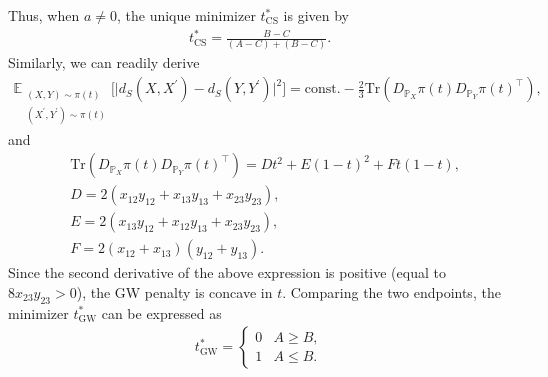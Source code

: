 \documentclass{article}
\begin{document}
Thus, when $a \neq 0$, the unique minimizer $t_{\mathrm{CS}}^\ast$ is given by 
\begin{align*}
	t_{\mathrm{CS}}^\ast = \frac{B - C}{(A - C) + (B - C)} .
\end{align*}
Similarly, we can readily derive
\begin{align*}
	\mathbb{E}_{\substack{(X,Y)\sim\pi(t)\\(X^\prime,Y^\prime)\sim\pi(t)}}
	\Big[\big|d_S(X,X^\prime)-d_S(Y,Y^\prime)\big|^2\Big] = \mathrm{const.} - \frac{2}{3}\mathrm{Tr}(D_{\mathbb{P}_X} \pi(t) D_{\mathbb{P}_Y} \pi(t)^\top) ,
\end{align*}
and
\begin{align*}
	&\mathrm{Tr}(D_{\mathbb{P}_X} \pi(t) D_{\mathbb{P}_Y} \pi(t)^\top) = D t^2 + E (1 - t)^2 + Ft(1-t) , \\[5pt]
	&D = 2(x_{12}y_{12} + x_{13}y_{13} + x_{23}y_{23}) , \\
	&E = 2(x_{13}y_{12} + x_{12}y_{13} + x_{23}y_{23}) , \\
	&F = 2(x_{12}+x_{13})(y_{12} + y_{13}) .
\end{align*}
Since the second derivative of the above expression is positive (equal to $8x_{23}y_{23} > 0$),  
the GW penalty is concave in $t$.  
Comparing the two endpoints, the minimizer $t_{\mathrm{GW}}^\ast$ can be expressed as
\begin{align*}
	t_{\mathrm{GW}}^\ast = \begin{cases}
		0 & A \geq B , \\
		1 & A \leq B .
	\end{cases}
\end{align*}
\end{document}
